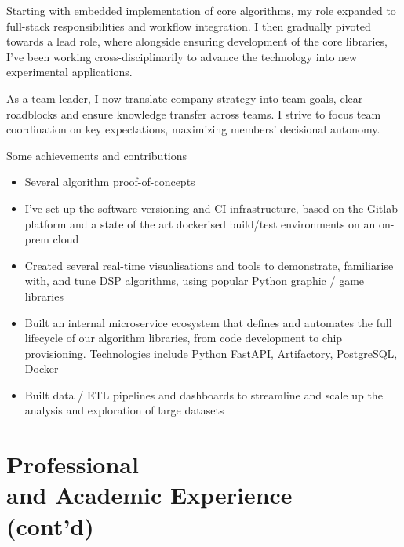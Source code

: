 \begin{resume}
{Starting with embedded implementation of core algorithms, my role expanded to full-stack responsibilities and workflow integration.
I then gradually pivoted towards a lead role, where alongside ensuring development of the core libraries, I've been working cross-disciplinarily to advance the technology into new experimental applications.

As a team leader, I now translate company strategy into team goals, clear roadblocks and ensure knowledge transfer across teams.
I strive to focus team coordination on key expectations, maximizing members' decisional autonomy.

Some achievements and contributions
\begin{itemize}
 \item Several algorithm proof-of-concepts
 \item I've set up the software versioning and CI infrastructure, based on the Gitlab platform and a state of the art dockerised build/test environments on an on-prem cloud
 \item Created several real-time visualisations and tools to demonstrate, familiarise with, and tune DSP algorithms, using popular Python graphic / game libraries
 \item Built an internal microservice ecosystem that defines and automates the full lifecycle of our algorithm libraries, from code development to chip provisioning. Technologies include Python FastAPI, Artifactory, PostgreSQL, Docker
 \item Built data / ETL pipelines and dashboards to streamline and scale up the analysis and exploration of large datasets
\end{itemize}

}
\pagebreak
\section{Professional \\and Academic Experience\\(cont'd)}


\end{resume}
